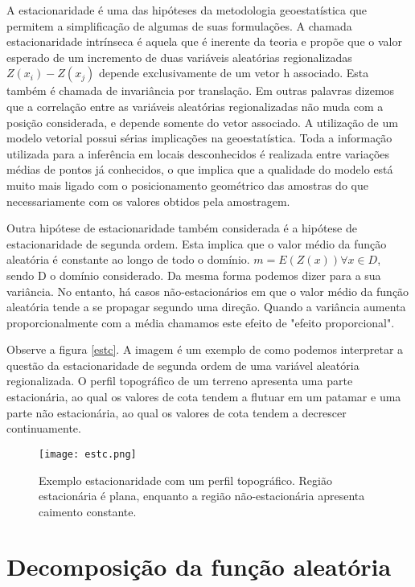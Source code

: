 A estacionaridade é uma das hipóteses da metodologia geoestatística que permitem a simplificação de algumas de suas formulações. A chamada estacionaridade intrínseca é aquela que é inerente da teoria e propõe que o valor esperado de um incremento de duas variáveis aleatórias regionalizadas $Z(x_{i}) -Z(x_{j})$ depende exclusivamente de um vetor h associado. Esta também é chamada de invariância por translação. Em outras palavras dizemos que a correlação entre as variáveis aleatórias regionalizadas não muda com a posição considerada, e depende somente do vetor associado. A utilização de um modelo vetorial possui sérias implicações na geoestatística. Toda a informação utilizada para a inferência em locais desconhecidos é realizada entre variações médias de pontos já conhecidos, o que implica que a qualidade do modelo está muito mais ligado com o posicionamento geométrico das amostras do que necessariamente com os valores obtidos pela amostragem. 

Outra hipótese de estacionaridade também considerada é a hipótese de estacionaridade de segunda ordem. Esta implica que o valor médio da função aleatória é constante ao longo de todo o domínio. $ m = E(Z(x)) \forall x \in D$, sendo D o domínio considerado. Da mesma forma podemos dizer para a sua variância. No entanto, há casos não-estacionários em que o valor médio da função aleatória tende a se propagar segundo uma direção. Quando a variância aumenta proporcionalmente com a média chamamos este efeito de "efeito proporcional".

Observe a figura \eqref{estc}. A imagem é um exemplo de como podemos interpretar a questão da estacionaridade de segunda ordem de uma variável aleatória regionalizada. O perfil topográfico de um terreno apresenta uma parte estacionária, ao qual os valores de cota tendem a flutuar em um patamar e uma parte não estacionária, ao qual os valores de cota tendem a decrescer continuamente. 

\begin{figure}[H]
\centering
\texttt{[image: estc.png]}	
\caption{Exemplo estacionaridade com um perfil topográfico. Região estacionária é plana, enquanto a região não-estacionária apresenta caimento constante.}
\label{estc}
\end{figure}

\section{Decomposição da função aleatória} \label{residuo}

